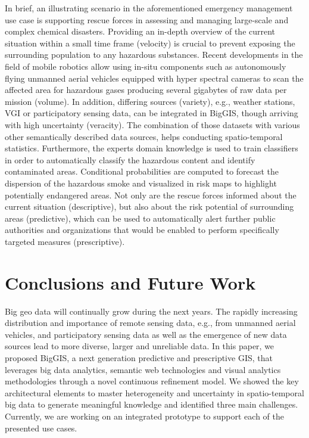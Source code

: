\documentclass{sig-alternate-05-2015}
\begin{document}
In brief, an illustrating scenario in the aforementioned emergency management
use case is supporting rescue forces in assessing and managing large-scale and
complex chemical disasters. Providing an in-depth overview of the current
situation within a small time frame (velocity) is crucial to prevent exposing
the surrounding population to any hazardous substances. Recent developments in
the field of mobile robotics allow using in-situ components such as
autonomously flying unmanned aerial vehicles equipped with hyper spectral
cameras to scan the affected area for hazardous gases producing several
gigabytes of raw data per mission (volume). In addition, differing sources
(variety), e.g., weather stations, VGI or participatory sensing data, can be
integrated in BigGIS, though arriving with high uncertainty (veracity). The
combination of those datasets with various other semantically described data
sources, helps conducting spatio-temporal statistics. Furthermore, the experts
domain knowledge is used to train classifiers in order to automatically
classify the hazardous content and identify contaminated areas. Conditional
probabilities are computed to forecast the dispersion of the hazardous smoke
and visualized in risk maps to highlight potentially endangered areas. Not only
are the rescue forces informed about the current situation (descriptive), but
also about the risk potential of surrounding areas (predictive), which can be
used to automatically alert further public authorities and organizations that
would be enabled to perform specifically targeted measures (prescriptive).

\section{Conclusions and Future Work}
\label{sec:concl}
Big geo data will continually grow during the next years. The
rapidly increasing distribution and importance of remote sensing data, e.g.,
from unmanned aerial vehicles, and participatory sensing data as well as the
emergence of new data sources lead to more diverse, larger and unreliable data.
In this paper, we proposed BigGIS, a next generation predictive and
prescriptive GIS, that leverages big data analytics, semantic web technologies
and visual analytics methodologies through a novel continuous refinement model.
We showed the key architectural elements to master heterogeneity and
uncertainty in spatio-temporal big data to generate meaningful knowledge and
identified three main challenges. Currently, we are working on an integrated
prototype to support each of the presented use cases.
\end{document}
